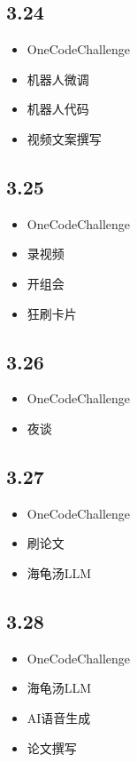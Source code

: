\documentclass[UTF8]{ctexart}
\begin{document}
\subsection*{3.24}
\begin{itemize}
    \item OneCodeChallenge
    \item 机器人微调
    \item 机器人代码
    \item 视频文案撰写
\end{itemize}

\subsection*{3.25}
\begin{itemize}
    \item OneCodeChallenge
    \item 录视频
    \item 开组会
    \item 狂刷卡片
\end{itemize}

\subsection*{3.26}
\begin{itemize}
    \item OneCodeChallenge
    \item 夜谈
\end{itemize}

\subsection*{3.27}
\begin{itemize}
    \item OneCodeChallenge
    \item 刷论文
    \item 海龟汤LLM
\end{itemize}

\subsection*{3.28}
\begin{itemize}
    \item OneCodeChallenge
    \item 海龟汤LLM
    \item AI语音生成
    \item 论文撰写
\end{itemize}
\end{document}
